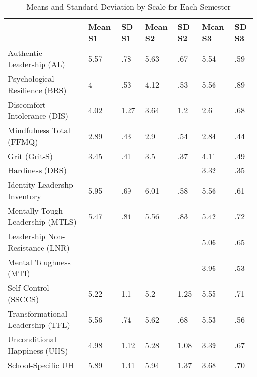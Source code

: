 \begin{table}[ht]
\centering
\begin{tabular}{lll|ll|ll}
  \hline
 & Mean S1 & SD S1 & Mean S2 & SD S2 & Mean S3 & SD S3 \\ 
  \hline
Authentic Leadership (AL) & 5.57 & .78 & 5.63 & .67 & 5.54 & .59 \\ 
  Psychological Resilience (BRS) & 4 & .53 & 4.12 & .53 & 5.56 & .89 \\ 
  Discomfort Intolerance (DIS) & 4.02 & 1.27 & 3.64 & 1.2 & 2.6 & .68 \\ 
  Mindfulness Total (FFMQ) & 2.89 & .43 & 2.9 & .54 & 2.84 & .44 \\ 
  Grit (Grit-S) & 3.45 & .41 & 3.5 & .37 & 4.11 & .49 \\ 
  Hardiness (DRS) & -- & -- & -- & -- & 3.32 & .35 \\ 
  Identity Leadershp Inventory & 5.95 & .69 & 6.01 & .58 & 5.56 & .61 \\ 
  Mentally Tough Leadership (MTLS) & 5.47 & .84 & 5.56 & .83 & 5.42 & .72 \\ 
  Leadership Non-Resistance (LNR) & -- & -- & -- & -- & 5.06 & .65 \\ 
  Mental Toughness (MTI) & -- & -- & -- & -- & 3.96 & .53 \\ 
  Self-Control (SSCCS) & 5.22 & 1.1 & 5.2 & 1.25 & 5.55 & .71 \\ 
  Transformational Leadership (TFL) & 5.56 & .74 & 5.62 & .68 & 5.53 & .56 \\ 
  Unconditional Happiness (UHS) & 4.98 & 1.12 & 5.28 & 1.08 & 3.39 & .67 \\ 
  School-Specific UH & 5.89 & 1.41 & 5.94 & 1.37 & 3.68 & .70 \\ 
   \hline
\end{tabular}
\caption{Means and Standard Deviation by Scale for Each Semester} 
\label{tab:summarystats}
\end{table}
